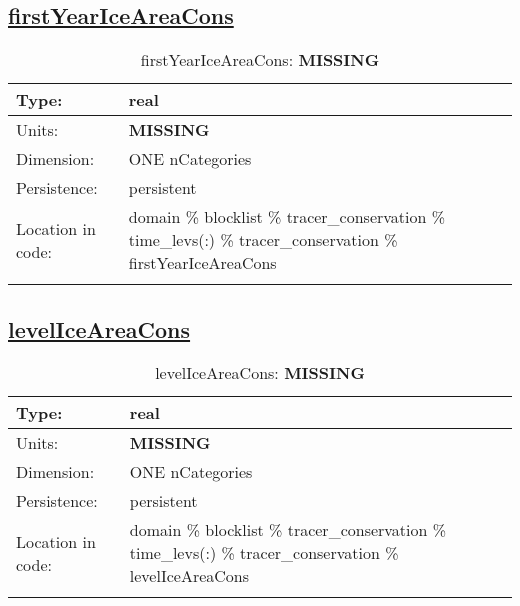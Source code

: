 \subsection[firstYearIceAreaCons]{\hyperref[sec:var_tab_tracer_conservation]{firstYearIceAreaCons}}
\label{subsec:var_sec_tracer_conservation_firstYearIceAreaCons}
\begin{center}
\begin{longtable}{| p{2.0in} | p{4.0in} |}
        \hline 
        Type: & real \\
        \hline 
        Units: & {\bf \color{red} MISSING} \\
        \hline 
        Dimension: & ONE nCategories \\
        \hline 
        Persistence: & persistent \\
        \hline 
         Location in code: & domain \% blocklist \% tracer\_conservation \% time\_levs(:) \% tracer\_conservation \% firstYearIceAreaCons \\
         \hline 
    \caption{firstYearIceAreaCons: {\bf \color{red} MISSING}}
\end{longtable}
\end{center}
\subsection[levelIceAreaCons]{\hyperref[sec:var_tab_tracer_conservation]{levelIceAreaCons}}
\label{subsec:var_sec_tracer_conservation_levelIceAreaCons}
\begin{center}
\begin{longtable}{| p{2.0in} | p{4.0in} |}
        \hline 
        Type: & real \\
        \hline 
        Units: & {\bf \color{red} MISSING} \\
        \hline 
        Dimension: & ONE nCategories \\
        \hline 
        Persistence: & persistent \\
        \hline 
         Location in code: & domain \% blocklist \% tracer\_conservation \% time\_levs(:) \% tracer\_conservation \% levelIceAreaCons \\
         \hline 
    \caption{levelIceAreaCons: {\bf \color{red} MISSING}}
\end{longtable}
\end{center}

